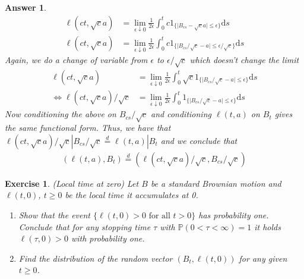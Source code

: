 \documentclass[12pt]{article}
\theoremstyle{colon}
\newtheorem{exercise}{Exercise}
\newtheorem*{answer}{Answer}
\begin{document}
\begin{answer}
  \begin{align*}
    \ell(ct,\sqrt{c}a) &= \lim_{\epsilon \downarrow 0} \frac{1}{2 \epsilon} \int_0^{t} c 1_{\{\lvert B_{cs} - \sqrt{c}a \rvert \leq \epsilon \}} \text{d}s \\
    \ell(ct,\sqrt{c}a) &= \lim_{\epsilon \downarrow 0} \frac{1}{2 \epsilon} \int_0^{t} c 1_{\{\lvert B_{cs}/\sqrt{c} - a \rvert \leq \epsilon/\sqrt{c} \}} \text{d}s
  \end{align*}
  Again, we do a change of variable from $\epsilon$ to $\epsilon/\sqrt{c}$ which doesn't change the limit
  \begin{align*}
    \ell(ct,\sqrt{c}a) &= \lim_{\epsilon \downarrow 0} \frac{1}{2 \epsilon} \int_0^{t} \sqrt{c} 1_{\{\lvert B_{cs}/\sqrt{c} - a \rvert \leq \epsilon \}} \text{d}s \\
    \Longleftrightarrow \ell(ct,\sqrt{c}a)/\sqrt{c} &= \lim_{\epsilon \downarrow 0} \frac{1}{2 \epsilon} \int_0^{t} 1_{\{\lvert B_{cs}/\sqrt{c} - a \rvert \leq \epsilon \}} \text{d}s
  \end{align*}
  Now conditioning the above on $B_{cs}/\sqrt{c}$ and conditioning $\ell(t,a)$ on $B_t$ gives the same functional form. Thus, we have that $\ell(ct,\sqrt{c}a)/\sqrt{c} | B_{cs}/\sqrt{c} \stackrel{d}{=} \ell(t,a) | B_t$ and we conclude that
  \begin{gather*}
    (\ell(t,a), B_t) \stackrel{d}{=} (\ell(ct,\sqrt{c}a)/\sqrt{c}, B_{cs}/\sqrt{c})
  \end{gather*}
\end{answer}

\clearpage

\begin{exercise}
  (Local time at zero) Let $B$ be a standard Brownian motion and $\ell(t,0)$, $t \geq 0$ be the local time it accumulates at 0.
  \begin{enumerate}[label=\alph*)]
    \item Show that the event $\{\ell(t,0) > 0  \text{ for all } t > 0\}$ has probability one. Conclude that for any stopping time $\tau$ with $\mathbb{P}(0 < \tau < \infty) = 1$ it holds $\ell(\tau,0) > 0$  with probability one.
    \item Find the distribution of the random vector $(B_t, \ell(t,0))$ for any given $t \geq 0$.
  \end{enumerate}
\end{exercise}
\end{document}
